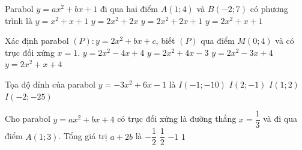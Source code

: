 \begin{ex}%
	Parabol $y=ax^2+bx+1$ đi qua hai điểm $A(1;4)$ và  $B(-2;7)$ có phương trình là
	\choice 
		{$ y=x^2+x+1$} 
		{$  y=2x^2+2x$}
		{$ y=2x^2+2x+1$} 
		{\True $ y=2x^2+x+1$} 
\end{ex}

\begin{ex}%
	Xác định parabol  $(P)\colon y=2x^2+bx+c$, biết $(P)$ qua điểm $M(0;4)$ và có trục đối xứng $x=1$.
	\choice 
		 {\True $y=2x^2-4x+4$}
		{$y=2x^2+4x-3$} 
		 {$y=2x^2-3x+4$}
		 {$y=2x^2+x+4$}
\end{ex}

\begin{ex}%
	Tọa độ đỉnh của  parabol $y=-3x^2+6x-1$ là
	\choice 
		{$ I(-1;-10) $} 
		{$ I(2;-1)  $}
		 {\True $ I(1;2) $}
		{$ I(-2;-25) $} 
\end{ex}

\begin{ex}%
	Cho parabol $y=a x^2+b x+4$ có trục đối xứng là đường thẳng $x=\dfrac{1}{3}$ và đi qua điểm $A(1; 3)$. Tổng giá  trị $a+2 b$ là
	 \choice
		{$-\dfrac{1}{2}$} 
		 {$\dfrac{1}{2}$}
		{$-1$} 
		 {\True $1$}
\end{ex}

